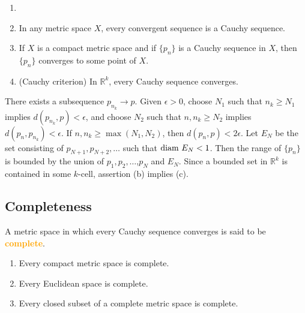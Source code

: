 \begin{theorem}
\label{thm:cauchy_criterion}
\begin{enumerate}[label={(\alph*)}]
\item[]
\item In any metric space $X$, every convergent sequence is a Cauchy sequence.
\item If $X$ is a compact metric space and if $\{p_n\}$ is a Cauchy sequence in $X$, then $\{p_n\}$ converges to some point of $X$.
\item (Cauchy criterion) In $\mathbb{R}^k$, every Cauchy sequence converges.
\end{enumerate}
\end{theorem}
\begin{hardproof}
 There exists a subsequence $p_{n_k}\to p$. Given $\epsilon>0$, choose $N_1$ such that $n_k\geq N_1$ implies $d(p_{n_k},p)<\epsilon$, and choose $N_2$ such that $n, n_k\geq N_2$ implies $d(p_n, p_{n_k})<\epsilon$. If $n,n_k\geq \max (N_1, N_2)$, then $d(p_n,p)<2\epsilon$.
 Let $E_N$ be the set consisting of $p_{N+1},p_{N+2},\dots$ such that $\text{diam } E_N<1$. Then the range of $\{p_n\}$ is bounded by the union of $p_1,p_2,\dots$,$p_N$ and $E_N$. Since a bounded set in $\mathbb{R}^k$ is contained in some $k$-cell, assertion (b) implies (c).
\end{hardproof}

\subsection{Completeness}

\begin{definition}
A metric space in which every Cauchy sequence converges is said to be \textbf{\textcolor{orange}{complete}}.
\end{definition}

\begin{remark}
\begin{enumerate}[label={(\arabic*)}]
\item Every compact metric space is complete.
\item Every Euclidean space is complete.
\item Every closed subset of a complete metric space is complete.
\end{enumerate}
\end{remark}

